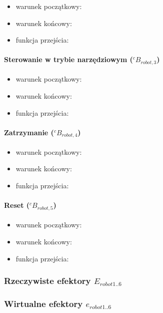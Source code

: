 \documentclass[a4paper, 12pt, twoside]{article}
\begin{document}
\begin{itemize}
\item warunek początkowy: 
\item warunek końcowy:
\item funkcja przejścia:
\end{itemize}

\paragraph{Sterowanie w trybie narzędziowym ($^cB_{robot,3}$)}

\begin{itemize}
\item warunek początkowy: 
\item warunek końcowy:
\item funkcja przejścia:
\end{itemize}

\paragraph{Zatrzymanie ($^cB_{robot,4}$)}

\begin{itemize}
\item warunek początkowy: 
\item warunek końcowy:
\item funkcja przejścia:
\end{itemize}

\paragraph{Reset ($^cB_{robot,5}$)}

\begin{itemize}
\item warunek początkowy: 
\item warunek końcowy:
\item funkcja przejścia:
\end{itemize}

\subsubsection{Rzeczywiste efektory $E_{robot1..6}$}

\subsubsection{Wirtualne efektory $e_{robot1..6}$}
\end{document}
